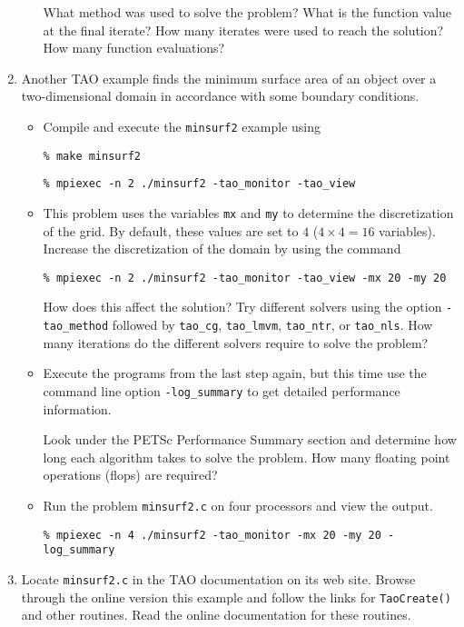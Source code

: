 \documentclass[11pt]{article}
\begin{document}
\begin{enumerate}
\begin{itemize}
  What method was used to solve the problem?
  What is the function value at the final iterate? 
  How many iterates were used to reach the solution?  
  How many function evaluations?

 \newpage

\end{itemize}

\item
Another TAO example finds the minimum surface area of an object over a
two-dimensional domain in accordance with some boundary conditions.

\begin{itemize}

\item
Compile and execute the \texttt{minsurf2} example using
    
\texttt{\% make minsurf2}

\texttt{\% mpiexec -n 2 ./minsurf2 -tao\_monitor -tao\_view}

\item
This problem uses the variables {\tt mx} and {\tt my} to determine
the discretization of the grid.  By default, these values are set to
$4$ ($4 \times 4 = 16$ variables). Increase the discretization of the 
domain by using the command 

\texttt{\% mpiexec -n 2 ./minsurf2 -tao\_monitor -tao\_view -mx 20 -my 20}

How does this affect the solution?
Try different solvers using the option \texttt{-tao\_method} followed by
\texttt{tao\_cg},
\texttt{tao\_lmvm}, \texttt{tao\_ntr}, or \texttt{tao\_nls}.
How many iterations do the different solvers require to solve the problem?


\item
Execute the programs from the last step again, but this time use the command line option 
\texttt{-log\_summary} to get detailed performance information.

Look under the PETSc Performance Summary section and determine how long
each algorithm takes to solve the problem. How many floating point operations (flops) are required? 


\item
Run the problem \texttt{minsurf2.c} on four processors and view the output.

\texttt{\% mpiexec -n 4 ./minsurf2 -tao\_monitor -mx 20 -my 20 -log\_summary}

\end{itemize}

\item 
  Locate \texttt{minsurf2.c} in the TAO documentation on its web site.  Browse through
  the online version this example and follow the links for
  \texttt{TaoCreate()} and other routines.  Read the online documentation for these routines.


\end{enumerate}
\end{document}
